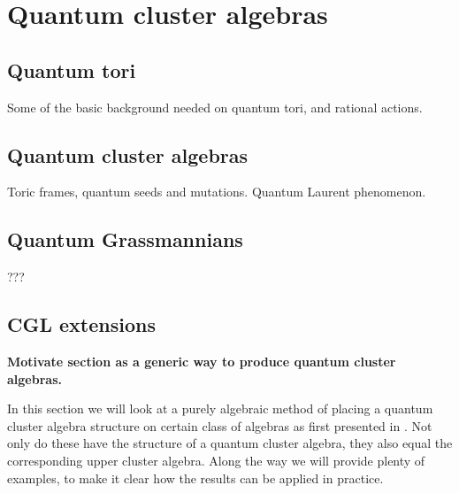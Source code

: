 \newcommand{\bbr}{\mathbf{r}}
\newcommand{\bbn}{\boldsymbol{\nu}}
\newcommand{\oy}{\overline{y}}
\renewcommand{\oe}{\overline{e}}
\chapter{Quantum cluster algebras}
\section{Quantum tori}

Some of the basic background needed on quantum tori, and rational actions.

\section{Quantum cluster algebras}

Toric frames, quantum seeds and mutations. Quantum Laurent phenomenon.

\section{Quantum Grassmannians}
???

\section{CGL extensions}

\textbf{Motivate section as a generic way to produce quantum cluster algebras.}

In this section we will look at a purely algebraic method of placing a quantum cluster
algebra structure on certain class of algebras as first presented in
\cite{GoodearlYakimov2017QCA}. Not only do these have the structure of a quantum
cluster algebra, they also equal the corresponding upper cluster algebra. Along the way
we will provide plenty of examples, to make it clear how the results can be applied in
practice.

